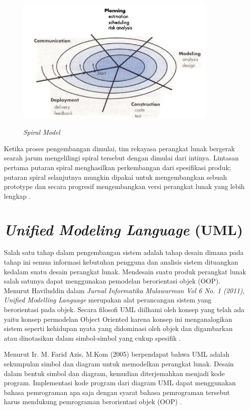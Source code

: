 \begin{figure}[H]
	\centering
	\includegraphics[width=10cm,height=7cm]{gambar/spiral}
	\caption{\textit{Spiral Model}}
	\label{spiral_model}
\end{figure}

Ketika proses pengembangan dimulai, tim rekayasa perangkat lunak bergerak searah jarum mengelilingi spiral tersebut dengan dimulai dari intinya. Lintasan pertama putaran spiral menghasilkan perkembangan dari spesifikasi produk; putaran spiral selanjutnya mungkin dipakai untuk mengembangkan sebuah prototype dan secara progresif mengembangkan versi perangkat lunak yang lebih lengkap \cite{Terjemahan_Pressman}.

\section{\textit{Unified Modeling Language} (UML)} 

Salah satu tahap dalam pengembangan sistem adalah tahap desain dimana pada tahap ini semua informasi kebutuhan pengguna dan analisis sistem dituangkan kedalam suatu desain perangkat lunak. Mendesain suatu produk perangkat lunak salah satunya dapat menggunakan pemodelan berorientasi objek (OOP). Menurut Haviluddin dalam \textit{Jurnal Informatika Mulawarman Vol 6 No. 1 (2011)}, \textit{Unified Modelling Language} merupakan alat perancangan sistem yang berorientasi pada objek. Secara filosofi UML diilhami oleh konsep yang telah ada yaitu konsep permodelan Object Oriented karena konsep ini menganalogikan sistem seperti kehidupan nyata yang didominasi oleh objek dan digambarkan atau dinotasikan dalam simbol-simbol yang cukup spesifik \cite{Haviluddin}.
 
Menurut Ir. M. Farid Azis, M.Kom (2005) berpendapat bahwa UML adalah sekumpulan simbol dan diagram untuk memodelkan perangkat lunak. Desain dalam bentuk simbol dan diagram, kemudian diterjemahkan menjadi kode program. Implementasi kode program dari diagram UML dapat menggunakan bahasa pemrograman apa saja dengan syarat bahasa pemrograman tersebut harus mendukung pemrograman berorientasi objek (OOP) \cite{Azis}. 

